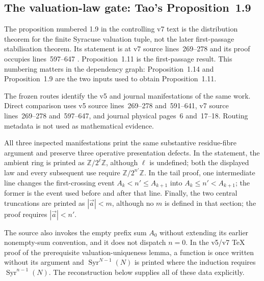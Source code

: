 \subsection{The valuation-law gate: Tao's Proposition~1.9}

The proposition numbered 1.9 in the controlling v7 text is the distribution
theorem for the finite Syracuse valuation tuple, not the later first-passage
stabilisation theorem.  Its statement is at v7 source lines~269--278 and its
proof occupies lines~597--647 \cite{Tao2026v7}.  Proposition~1.11 is the
first-passage result.  This numbering matters in the dependency graph:
Proposition~1.14 and Proposition~1.9 are the two inputs used to obtain
Proposition~1.11.

The frozen routes identify the v5 and journal manifestations of the same
work.  Direct comparison uses v5 source lines~269--278 and~591--641, v7
source lines~269--278 and~597--647, and journal physical pages~6 and~17--18.
Routing metadata is not used as mathematical evidence.

\begin{sourceissue}
\label{sourceissue:Tao-Prop19-three-manifestations}
All three inspected manifestations print the same substantive residue-fibre
argument and preserve three operative presentation defects.  In the
statement, the ambient ring is printed as \(\mathbb Z/2^\ell\mathbb Z\),
although \(\ell\) is undefined; both the displayed law and every subsequent
use require \(\mathbb Z/2^{n'}\mathbb Z\).  In the tail proof, one intermediate
line changes the first-crossing event
\(A_k<n'\leq A_{k+1}\) into \(A_k\leq n'<A_{k+1}\); the former is the event
used before and after that line.  Finally, the two central truncations are
printed as \(|\vec a|<m\), although no \(m\) is defined in that section; the
proof requires \(|\vec a|<n'\).

The source also invokes the empty prefix sum \(A_0\) without extending its
earlier nonempty-sum convention, and it does not dispatch \(n=0\).  In the
v5/v7 TeX proof of the prerequisite valuation-uniqueness lemma, a function is
once written without its argument and \(\operatorname{Syr}^{N-1}(N)\) is
printed where the induction requires \(\operatorname{Syr}^{n-1}(N)\).
The reconstruction below supplies all of these data explicitly.
\end{sourceissue}

